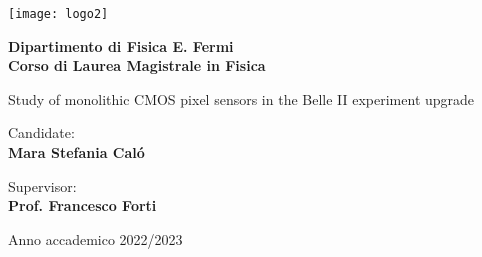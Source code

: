 \documentclass[10pt,a4paper]{report}
\begin{document}
\begin{titlepage}
    \begin{center}
        \texttt{[image: logo2]}
        \vspace*{1.2cm}

        \LARGE

        \textbf{ \large Dipartimento di Fisica E. Fermi \\ Corso di Laurea Magistrale in Fisica}

        \vspace*{2.5cm}
        
        \huge
        Study of monolithic CMOS pixel sensors in the Belle II experiment upgrade

        \normalsize
        \vspace*{4cm}

        
        
        \begin{minipage}[t]{0.47\textwidth}
	       {Candidate:} \hspace{-0.9em} \vspace{0.3em} \\
              {\large \textbf{Mara Stefania Caló}} %
        \end{minipage}
        \hfill
        \begin{minipage}[t]{0.47\textwidth}\raggedleft
	       {Supervisor:} \vspace{0.3em} \\
              {\large \textbf{Prof. Francesco Forti}} \vspace{1em}  \\
        \end{minipage}

        \vfill
        Anno accademico 2022/2023
            
    \end{center}
\end{titlepage}


\doublespacing
\tableofcontents
\singlespacing

\newpage

%



%
\end{document}
